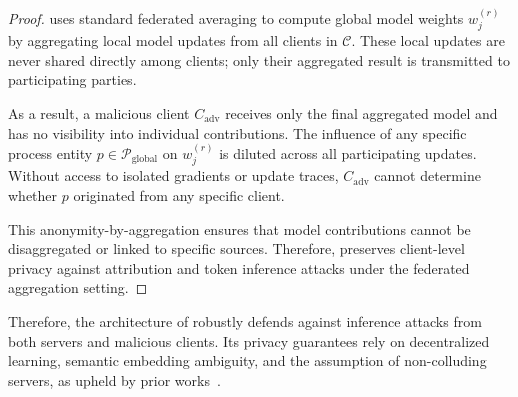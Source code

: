   \begin{proof}
  \Sys uses standard federated averaging to compute global model weights \(w_j^{(r)}\) by aggregating local model updates from all clients in \(\mathcal{C}\). These local updates are never shared directly among clients; only their aggregated result is transmitted to participating parties.
  
  As a result, a malicious client \(C_{\text{adv}}\) receives only the final aggregated model and has no visibility into individual contributions. The influence of any specific process entity \(p \in \mathcal{P}_{\text{global}}\) on \(w_j^{(r)}\) is diluted across all participating updates. Without access to isolated gradients or update traces, \(C_{\text{adv}}\) cannot determine whether \(p\) originated from any specific client.
  
  This anonymity-by-aggregation ensures that model contributions cannot be disaggregated or linked to specific sources. Therefore, \Sys preserves client-level privacy against attribution and token inference attacks under the federated aggregation setting.
  \end{proof}  

Therefore, the architecture of \Sys robustly defends against inference attacks from both servers and malicious clients. Its privacy guarantees rely on decentralized learning, semantic embedding ambiguity, and the assumption of non-colluding servers, as upheld by prior works~\cite{roy2020crypte,wu2022federated}.

